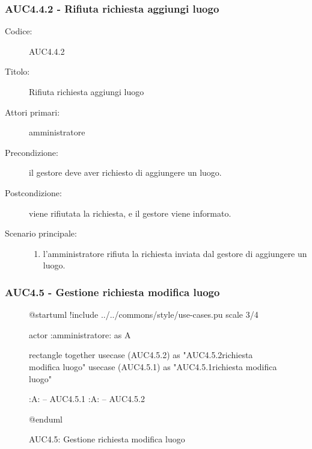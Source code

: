 \documentclass[casi-duso]{subfiles}
\begin{document}
\subsubsection{AUC4.4.2 - Rifiuta richiesta aggiungi luogo}%
\label{subsub:AUC4.4.2}
\begin{description}
  \item[Codice:] AUC4.4.2
  \item[Titolo:] Rifiuta richiesta aggiungi luogo
  \item[Attori primari:] amministratore
  \item[Precondizione:] il gestore deve aver richiesto di aggiungere un luogo.
  \item[Postcondizione:] viene rifiutata la richiesta, e il gestore viene informato.
  \item[Scenario principale:]
  \begin{enumerate}
    \item l'amministratore rifiuta la richiesta inviata dal gestore di aggiungere un luogo.
  \end{enumerate}
\end{description}

\subsubsection{AUC4.5 - Gestione richiesta modifica luogo}%
\label{subsub:AUC4.5}

\begin{figure}[h!] 
  \centering 
  \begin{plantuml}
  @startuml
  !include ../../commons/style/use-cases.pu
  scale 3/4

  actor :amministratore: as A

  rectangle {
    together {
      usecase (AUC4.5.2) as "AUC4.5.2\nRifiuta richiesta modifica luogo"
      usecase (AUC4.5.1) as "AUC4.5.1\nAccetta richiesta modifica luogo"
    }
  }

  :A: -- AUC4.5.1
  :A: -- AUC4.5.2

  @enduml
  \end{plantuml} 
  \caption{AUC4.5: Gestione richiesta modifica luogo} 
  \label{fig:auc } 
\end{figure}
\end{document}
